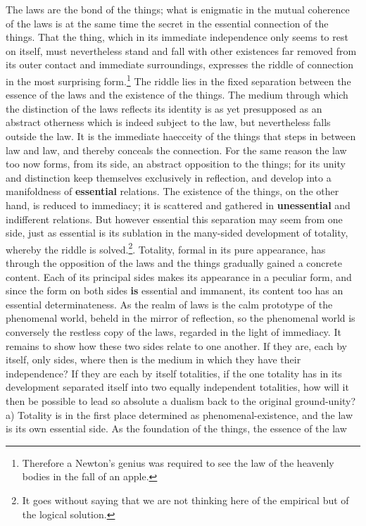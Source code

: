 \documentclass[12pt,a4paper,openany]{book}
\newcommand{\opage}[1]{\marginnote{\footnotesize\textit{[#1]}}}
\begin{document}
The laws are the bond of the things; what is enigmatic in
the mutual coherence of the laws is at the same time the secret
in the essential connection of the things. That the thing,
which in its immediate independence only seems
to rest on itself, must nevertheless stand and fall
with other existences far removed from its outer contact and immediate
surroundings, expresses the riddle of connection in the most surprising form.\footnote{Therefore a Newton's genius was required to see the law of the heavenly bodies in the fall of an apple.}
The riddle lies in the fixed separation between the essence of the laws
and the existence of the things. The medium
through which the distinction of the laws reflects its identity
is as yet presupposed as an abstract otherness which
is indeed subject to the law, but nevertheless falls outside the law.
It is the immediate haecceity of the things that
steps in between law and law, and thereby conceals the connection.
For the same reason the law too now forms,
from its side, an abstract opposition to the things;
for its unity and distinction keep themselves exclusively in
reflection, and develop into a manifoldness of
\setcounter{footnote}{0}%
\opage{190}\textbf{essential} relations. The existence of the things, on the other hand, is
reduced to immediacy; it is scattered and gathered
in \textbf{unessential} and indifferent relations. But
however essential this separation may seem from one side,
just as essential is its sublation
in the many-sided development of totality, whereby the riddle
is solved.\footnote{It goes without saying that we are not thinking here of the empirical but of the logical solution.}.
Totality, formal in its pure appearance,
has through the opposition of the laws and the things gradually
gained a concrete content. Each of its
principal sides makes its appearance in a peculiar form, and
since the form on both sides \textbf{is} essential and immanent,
its content too has an essential determinateness.
As the realm of laws is the calm prototype of the phenomenal world,
beheld in the mirror of reflection,
so the phenomenal world is conversely the restless copy of the laws,
regarded in the light of immediacy.
It remains to show how these
two sides relate to one another.
If they are, each by itself, only sides, where then is the medium
in which they have their independence? If
they are each by itself totalities, if the one totality has
in its development separated itself into two equally independent
totalities, how will it then be possible
to lead so absolute a dualism back to the original
ground-unity? a) Totality is in the first place determined as phenomenal-existence, and the law is its own essential
side. As the foundation of the things, the essence of the law
\end{document}
